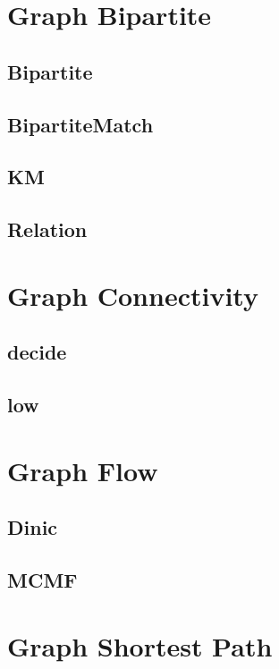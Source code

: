 \section{Graph Bipartite}

\subsection{Bipartite}

\subsection{BipartiteMatch}

\subsection{KM}

\subsection{Relation}


\section{Graph Connectivity}
\subsection{decide}

\subsection{low}


\section{Graph Flow}

\subsection{Dinic}

\subsection{MCMF}


\section{Graph Shortest Path}

